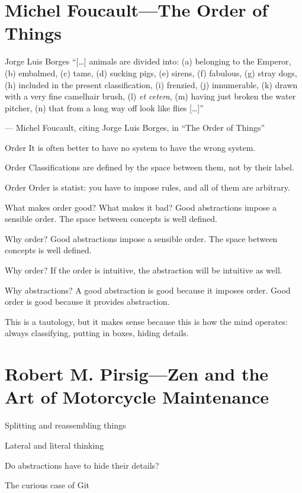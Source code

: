 \documentclass[aspectratio=169]{beamer}
\begin{document}
  \section{Michel Foucault—The Order of Things}
  \begin{frame}{Jorge Luis Borges}
    “[\ldots] animals are divided into: (a) belonging to the Emperor, (b)
    embalmed, (c) tame, (d) sucking pigs, (e) sirens, (f) fabulous, (g) stray
    dogs, (h) included in the present classification, (i) frenzied, (j)
    innumerable, (k) drawn with a very fine camelhair brush, (l) \textit{et
    cetera}, (m) having just broken the water pitcher, (n) that from a long
    way off look like flies [\ldots]”

    — Michel Foucault, citing Jorge Luis Borges, in “The Order of Things”
  \end{frame}
  \begin{frame}{Order}
    It is often better to have no system to have the wrong system.
  \end{frame}
  \begin{frame}{Order}
    Classifications are defined by the space between them, not by their label.
  \end{frame}
  \begin{frame}{Order}
    Order is statist: you have to impose rules, and all of them are arbitrary.
  \end{frame}
  \begin{frame}{What makes order good? What makes it bad?}
    Good abstractions impose a sensible order. The space between concepts is
    well defined.
  \end{frame}
  \begin{frame}{Why order?}
    Good abstractions impose a sensible order. The space between concepts is
    well defined.
  \end{frame}
  \begin{frame}{Why order?}
    If the order is intuitive, the abstraction will be intuitive as well.
  \end{frame}
  \begin{frame}{Why abstractions?}
    A good abstraction is good because it imposes order. Good order is good
    because it provides abstraction.

    This is a tautology, but it makes sense because this is how the mind
    operates: always classifying, putting in boxes, hiding details.
  \end{frame}
  \section{Robert M. Pirsig—Zen and the Art of Motorcycle Maintenance}
  \begin{frame}{Splitting and reassembling things}
  \end{frame}
  \begin{frame}{Lateral and literal thinking}
  \end{frame}
  \begin{frame}{Do abstractions have to hide their details?}
  \end{frame}
  \begin{frame}{The curious case of Git}
  \end{frame}
\end{document}
